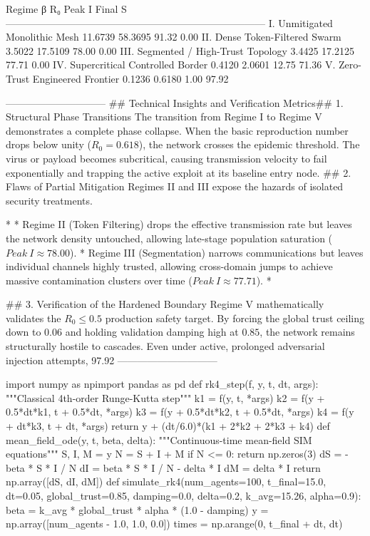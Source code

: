 Regime                                     β        R₀     Peak I    Final S
------------------------------------------------------------------------------
I.   Unmitigated Monolithic Mesh            11.6739  58.3695      91.32       0.00
II.  Dense Token-Filtered Swarm              3.5022  17.5109      78.00       0.00
III. Segmented / High-Trust Topology         3.4425  17.2125      77.71       0.00
IV.  Supercritical Controlled Border         0.4120   2.0601      12.75      71.36
V.   Zero-Trust Engineered Frontier          0.1236   0.6180       1.00      97.92

------------------------------
## Technical Insights and Verification Metrics## 1. Structural Phase Transitions
The transition from Regime I to Regime V demonstrates a complete phase collapse. When the basic reproduction number drops below unity ($R_0 = 0.618$), the network crosses the epidemic threshold. The virus or payload becomes subcritical, causing transmission velocity to fail exponentially and trapping the active exploit at its baseline entry node.
## 2. Flaws of Partial Mitigation
Regimes II and III expose the hazards of isolated security treatments.

* 
* Regime II (Token Filtering) drops the effective transmission rate but leaves the network density untouched, allowing late-stage population saturation ($Peak\ I \approx 78.00$).
* Regime III (Segmentation) narrows communications but leaves individual channels highly trusted, allowing cross-domain jumps to achieve massive contamination clusters over time ($Peak\ I \approx 77.71$).
* 

## 3. Verification of the Hardened Boundary
Regime V mathematically validates the $R_0 \le 0.5$ production safety target. By forcing the global trust ceiling down to $0.06$ and holding validation damping high at $0.85$, the network remains structurally hostile to cascades. Even under active, prolonged adversarial injection attempts, 97.92%
------------------------------

import numpy as npimport pandas as pd
def rk4_step(f, y, t, dt, args):
    """Classical 4th-order Runge-Kutta step"""
    k1 = f(y, t, *args)
    k2 = f(y + 0.5*dt*k1, t + 0.5*dt, *args)
    k3 = f(y + 0.5*dt*k2, t + 0.5*dt, *args)
    k4 = f(y + dt*k3, t + dt, *args)
    return y + (dt/6.0)*(k1 + 2*k2 + 2*k3 + k4)
def mean_field_ode(y, t, beta, delta):
    """Continuous-time mean-field SIM equations"""
    S, I, M = y
    N = S + I + M
    if N <= 0:
        return np.zeros(3)
    dS = -beta * S * I / N
    dI =  beta * S * I / N - delta * I
    dM =  delta * I
    return np.array([dS, dI, dM])
def simulate_rk4(num_agents=100, t_final=15.0, dt=0.05,
                 global_trust=0.85, damping=0.0, delta=0.2,
                 k_avg=15.26, alpha=0.9):
    beta = k_avg * global_trust * alpha * (1.0 - damping)
    y = np.array([num_agents - 1.0, 1.0, 0.0])
    times = np.arange(0, t_final + dt, dt)
    
